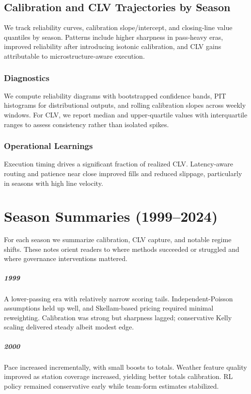 \documentclass[12pt]{report}  %
\numberwithin{equation}{section}
\theoremstyle{plain}
\theoremstyle{definition}
\theoremstyle{remark}
\begin{document}
\section{Calibration and CLV Trajectories by Season}
We track reliability curves, calibration slope/intercept, and closing‑line value quantiles by season. Patterns include higher sharpness in pass‑heavy eras, improved reliability after introducing isotonic calibration, and CLV gains attributable to microstructure‑aware execution.

\subsection*{Diagnostics}
We compute reliability diagrams with bootstrapped confidence bands, PIT histograms for distributional outputs, and rolling calibration slopes across weekly windows. For CLV, we report median and upper‑quartile values with interquartile ranges to assess consistency rather than isolated spikes.

\subsection*{Operational Learnings}
Execution timing drives a significant fraction of realized CLV. Latency‑aware routing and patience near close improved fills and reduced slippage, particularly in seasons with high line velocity.

\fi

\chapter{Season Summaries (1999--2024)}\label{app:season-summaries}
For each season we summarize calibration, CLV capture, and notable regime shifts. These notes orient readers to where methods succeeded or struggled and where governance interventions mattered.


\paragraph{1999} A lower-passing era with relatively narrow scoring tails. Independent-Poisson assumptions held up well, and Skellam-based pricing required minimal reweighting. Calibration was strong but sharpness lagged; conservative Kelly scaling delivered steady albeit modest edge.

\paragraph{2000} Pace increased incrementally, with small boosts to totals. Weather feature quality improved as station coverage increased, yielding better totals calibration. RL policy remained conservative early while team-form estimates stabilized.
\end{document}
